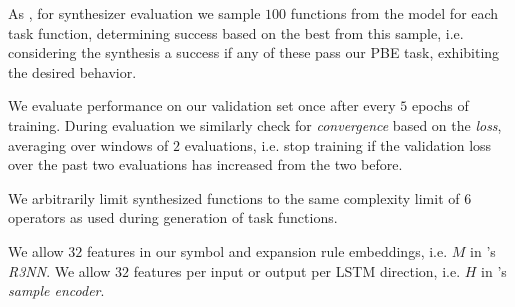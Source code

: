 \documentclass{article}
\begin{document}
As \citet{nsps}, for synthesizer evaluation we sample $100$ functions from the model for each task function,
determining success based on the best from this sample,
i.e. considering the synthesis a success if any of these pass our PBE task, exhibiting the desired behavior.

We evaluate performance on our validation set once after every $5$ epochs of training.
During evaluation we similarly check for \emph{convergence} based on the \emph{loss},
averaging over windows of $2$ evaluations,
i.e. stop training if the validation loss over the past two evaluations has increased from the two before.


We arbitrarily limit synthesized functions to the same complexity limit of $6$ operators as used during generation of task functions.

We allow $32$ features in our symbol and expansion rule embeddings, i.e. $M$ in \citet{nsps}'s \emph{R3NN}.
We allow $32$ features per input or output per LSTM direction, i.e. $H$ in \citet{nsps}'s \emph{sample encoder}.
\end{document}
